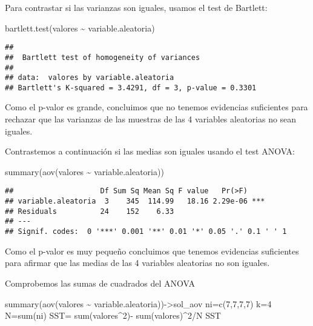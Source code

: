\documentclass[
]{article}
\newenvironment{Shaded}{\begin{snugshade}}{\end{snugshade}}
\newcommand{\DecValTok}[1]{\textcolor[rgb]{0.00,0.00,0.81}{#1}}
\newcommand{\FunctionTok}[1]{\textcolor[rgb]{0.00,0.00,0.00}{#1}}
\newcommand{\NormalTok}[1]{#1}
\newcommand{\OtherTok}[1]{\textcolor[rgb]{0.56,0.35,0.01}{#1}}
\newcommand{\SpecialCharTok}[1]{\textcolor[rgb]{0.00,0.00,0.00}{#1}}
\begin{document}
Para contrastar si las varianzas son iguales, usamos el test de
Bartlett:

\begin{Shaded}
\begin{Highlighting}[]
\FunctionTok{bartlett.test}\NormalTok{(valores }\SpecialCharTok{\textasciitilde{}}\NormalTok{ variable.aleatoria)}
\end{Highlighting}
\end{Shaded}

\begin{verbatim}
## 
##  Bartlett test of homogeneity of variances
## 
## data:  valores by variable.aleatoria
## Bartlett's K-squared = 3.4291, df = 3, p-value = 0.3301
\end{verbatim}

Como el p-valor es grande, concluimos que no tenemos evidencias
suficientes para rechazar que las varianzas de las muestras de las 4
variables aleatorias no sean iguales.

Contrastemos a continuación si las medias son iguales usando el test
ANOVA:

\begin{Shaded}
\begin{Highlighting}[]
\FunctionTok{summary}\NormalTok{(}\FunctionTok{aov}\NormalTok{(valores }\SpecialCharTok{\textasciitilde{}}\NormalTok{ variable.aleatoria))}
\end{Highlighting}
\end{Shaded}

\begin{verbatim}
##                    Df Sum Sq Mean Sq F value   Pr(>F)    
## variable.aleatoria  3    345  114.99   18.16 2.29e-06 ***
## Residuals          24    152    6.33                     
## ---
## Signif. codes:  0 '***' 0.001 '**' 0.01 '*' 0.05 '.' 0.1 ' ' 1
\end{verbatim}

Como el p-valor es muy pequeño concluimos que tenemos evidencias
suficientes para afirmar que las medias de las 4 variables aleatorias no
son iguales.

Comprobemos las sumas de cuadrados del ANOVA

\begin{Shaded}
\begin{Highlighting}[]
\FunctionTok{summary}\NormalTok{(}\FunctionTok{aov}\NormalTok{(valores }\SpecialCharTok{\textasciitilde{}}\NormalTok{ variable.aleatoria))}\OtherTok{{-}\textgreater{}}\NormalTok{sol\_aov}
\NormalTok{ni}\OtherTok{=}\FunctionTok{c}\NormalTok{(}\DecValTok{7}\NormalTok{,}\DecValTok{7}\NormalTok{,}\DecValTok{7}\NormalTok{,}\DecValTok{7}\NormalTok{)}
\NormalTok{k}\OtherTok{=}\DecValTok{4}
\NormalTok{N}\OtherTok{=}\FunctionTok{sum}\NormalTok{(ni)}
\NormalTok{SST}\OtherTok{=} \FunctionTok{sum}\NormalTok{(valores}\SpecialCharTok{\^{}}\DecValTok{2}\NormalTok{)}\SpecialCharTok{{-}} \FunctionTok{sum}\NormalTok{(valores)}\SpecialCharTok{\^{}}\DecValTok{2}\SpecialCharTok{/}\NormalTok{N}
\NormalTok{SST}
\end{Highlighting}
\end{Shaded}
\end{document}
